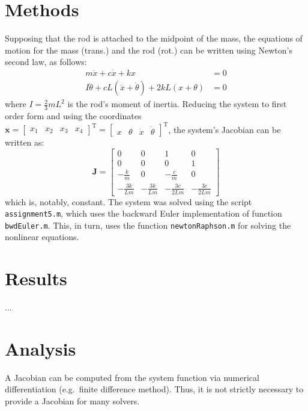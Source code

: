 \documentclass{article}
\begin{document}
	\section*{Methods}
	Supposing that the rod is attached to the midpoint of the mass, the equations of motion for the mass (trans.) and the rod (rot.) can be written using Newton's second law, as follows:
	\begin{equation}
		\begin{aligned}
		m \ddot{x} + c \dot{x} + k x &= 0\\
		I \ddot{\theta} + c L (\dot{x} + \dot{\theta}) + 2 k L (x + \theta) &= 0
		\end{aligned}
	\end{equation}
	where $I = \frac{2}{3} m L^2$ is the rod's moment of inertia. Reducing the system to first order form and using the coordinates $\bm{x} = \begin{bmatrix} x_1 & x_2 & x_3 & x_4 \end{bmatrix}^\text{T} = \begin{bmatrix} x & \theta & \dot{x} & \dot{\theta} \end{bmatrix}^\text{T}$, the system's Jacobian can be written as:
	\begin{equation}
		\mathbf{J} = \begin{bmatrix}
		0 & 0 & 1 & 0 \\
		0 & 0 & 0 & 1 \\
		-\frac{k}{m} & 0 & -\frac{c}{m} & 0 \\
		-\frac{3 k}{L m} & -\frac{3 k}{L m} & -\frac{3 c}{2 L m} & -\frac{3 c}{2 L m}
		\end{bmatrix}
	\end{equation}
	which is, notably, constant. The system was solved using the script \texttt{assignment5.m}, which uses the backward Euler implementation of function \texttt{bwdEuler.m}. This, in turn, uses the function \texttt{newtonRaphson.m} for solving the nonlinear equations.
	
	\section*{Results}
	...

	\section*{Analysis}
	A Jacobian can be computed from the system function via numerical differentiation (e.g.~finite difference method). Thus, it is not strictly necessary to provide a Jacobian for many solvers.
	
\end{document}
